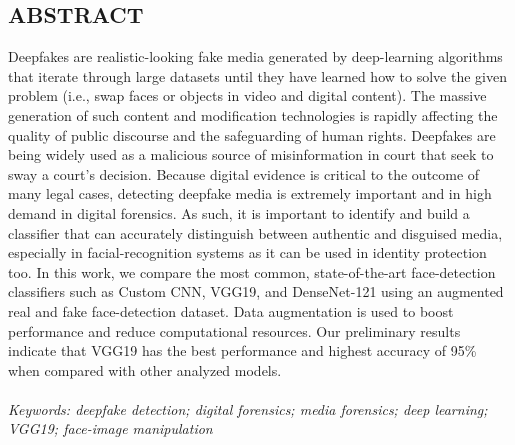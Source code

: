\documentclass[12 pt]{article}
\begin{document}
\begin{center}
    \section*{ABSTRACT}
    \justify
    Deepfakes are realistic-looking fake media generated by deep-learning algorithms that iterate through large datasets until
    they have learned how to solve the given problem (i.e., swap faces or objects in video and digital content). The massive generation
    of such content and modification technologies is rapidly affecting the quality of public discourse and the safeguarding of
    human rights. Deepfakes are being widely used as a malicious source of misinformation in court that seek to sway a court’s decision.
    Because digital evidence is critical to the outcome of many legal cases, detecting deepfake media is extremely important and in high demand in digital forensics.
    As such, it is important to identify and build a classifier that can accurately distinguish between authentic and disguised media, especially in facial-recognition systems
    as it can be used in identity protection too. In this work, we compare the most common, state-of-the-art face-detection classifiers such as Custom CNN, VGG19, and DenseNet-121
    using an augmented real and fake face-detection dataset. Data augmentation is used to boost performance and reduce computational resources. Our preliminary results indicate that VGG19 has the best performance
    and highest accuracy of 95\% when compared with other analyzed models.\\
    \vspace{3 in}
    \\ \textit{Keywords: deepfake detection; digital forensics; media forensics; deep learning; VGG19; face-image manipulation}

    \newpage

    \tableofcontents
    \thispagestyle{empty}
    \newpage
    \listoffigures
\end{center}
\newpage
{}
\end{document}
